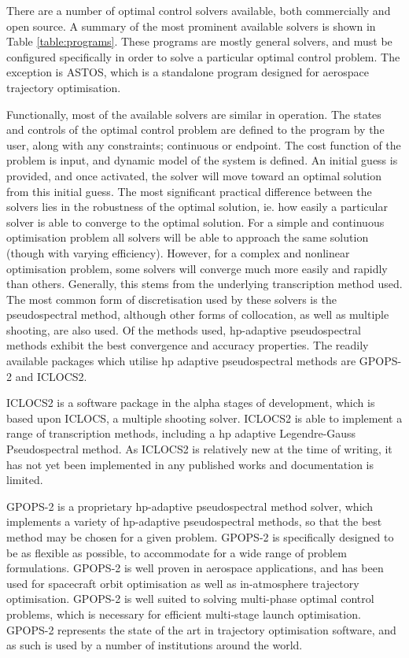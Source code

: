 There are a number of optimal control solvers available, both commercially and open source. A summary of the most prominent available solvers is shown in Table \ref{table:programs}. These programs are mostly general solvers, and must be configured specifically in order to solve a particular optimal control problem. The exception is ASTOS\cite{astos}, which is a standalone program designed for aerospace trajectory optimisation.

Functionally, most of the available solvers are similar in operation. The states and controls of the optimal control problem are defined to the program by the user, along with any constraints; continuous or endpoint. The cost function of the problem is input, and dynamic model of the system is defined. An initial guess is provided, and once activated, the solver will move toward an optimal solution from this initial guess. 
The most significant practical difference between the solvers lies in the robustness of the optimal solution, ie. how easily a particular solver is able to converge to the optimal solution. For a simple and continuous optimisation problem all solvers will be able to approach the same solution (though with varying efficiency). However, for a complex and nonlinear optimisation problem, some solvers will converge much more easily and rapidly than others. Generally, this stems from the underlying transcription method used. 
 The most common form of discretisation used by these solvers is the pseudospectral method, although other forms of collocation, as well as multiple shooting, are also used. Of the methods used, \textsf{hp}-adaptive pseudospectral methods exhibit the best convergence and accuracy properties\cite{Chai2015}. The readily available packages which utilise hp adaptive pseudospectral methods are GPOPS-2\cite{Rao2010} and ICLOCS2\cite{iclocs}.
 
 ICLOCS2 is a software package in the alpha stages of development, which is based upon ICLOCS, a multiple shooting solver\cite{iclocs}. ICLOCS2 is able to implement a range of transcription methods, including a hp adaptive Legendre-Gauss Pseudospectral method\cite{iclocs}. As ICLOCS2 is relatively new at the time of writing, it has not yet been implemented in any published works and documentation is limited. 
 
GPOPS-2 is a proprietary hp-adaptive pseudospectral method solver, which implements a variety of hp-adaptive pseudospectral methods, so that the best method may be chosen for a given problem\cite{Rao2010}. GPOPS-2 is specifically designed to be as flexible as possible, to accommodate for a wide range of problem formulations\cite{Rao2010}. GPOPS-2 is well proven in aerospace applications, and has been used for spacecraft orbit optimisation as well as in-atmosphere trajectory optimisation\cite{Rizvi2015,Lipp2014}. GPOPS-2 is well suited to solving multi-phase optimal control problems, which is necessary for efficient multi-stage launch optimisation\cite{Rao2010}. GPOPS-2 represents the state of the art in trajectory optimisation software, and as such is used by a number of institutions around the world. 

